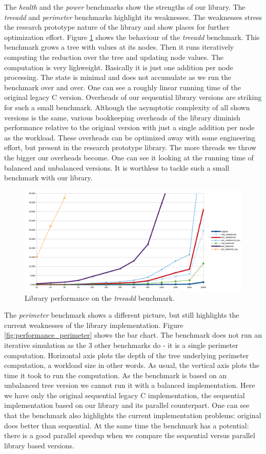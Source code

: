 \quad The \textit{health} and the \textit{power} benchmarks show the strengths of our library. The \textit{treeadd} and \textit{perimeter} benchmarks highlight its weaknesses. The weaknesses stress the research prototype nature of the library and show places for further optimization effort. Figure \ref{fig:performance_treeadd} shows the behaviour of the \textit{treeadd} benchmark. This benchmark grows a tree with values at its nodes. Then it runs iteratively computing the reduction over the tree and updating node values. The computation is very lighweight. Basically it is just one addition per node processing. The state is minimal and does not accumulate as we run the benchmark over and over. One can see a roughly linear running time of the original legacy C version. Overheads of our sequential library versions are striking for such a small benchmark. Although the asymptotic complexity of all shown versions is the same, various bookkeeping overheads of the library diminish performance relative to the original version with just a single addition per node as the workload. These overheads can be optimized away with some engineering effort, but present in the research prototype library. The more threads we throw the bigger our overheads become. One can see it looking at the running time of balanced and unbalanced versions. It is worthless to tackle such a small benchmark with our library.      
\begin{figure}[!htb]
\includegraphics[width=1.0\textwidth]{images/treeadd_depth_16.png}
\caption{Library performance on the \textit{treeadd} benchmark.}
\label{fig:performance_treeadd}
\end{figure}\newline\null
\quad The \textit{perimeter} benchmark shows a different picture, but still highlights the current weaknesses of the library implementation. Figure \ref{fig:performance_perimeter} shows the bar chart. The benchmark does not run an iterative simulation as the 3 other benchmarks do - it is a single perimeter computation. Horizontal axis plots the depth of the tree underlying perimeter computation, a workload size in other words. As usual, the vertical axis plots the time it took to run the computation. As the benchmark is based on an unbalanced tree version we cannot run it with a balanced implementation. Here we have only the original sequential legacy C implementation, the sequential implementation based on our library and its parallel counterpart. One can see that the benchmark also highlights the current implementation problems: original does better than sequential. At the same time the benchmark has a potential: there is a good parallel speedup when we compare the sequential versus parallel library based versions.
